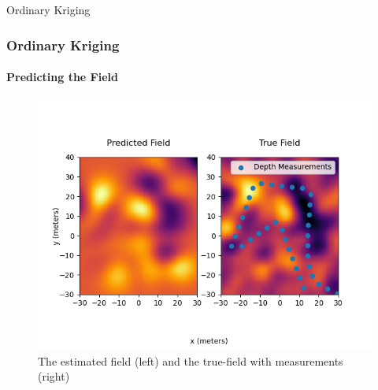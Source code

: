 \documentclass[professionalfont,10pt]{beamer}
\begin{document}
	\begin{frame}[t]{Ordinary Kriging}
		\frametitle{Ordinary Kriging}
		\framesubtitle{Predicting the Field}
		\hskip-0.75cm
		\begin{minipage}[t]{0.2\linewidth}\vspace{-0.5cm}
			\tiny\tableofcontents[currentsection,currentsubsection,hideothersubsections,subsectionstyle=show/shaded]
		\end{minipage}
		\hfill%
		\begin{minipage}[t]{0.86\linewidth}\vspace{-0.5cm}
			\begin{figure}[t]
				\centering
				\captionsetup{width=\textwidth}
				\includegraphics[width=\textwidth]{../images/estimatedField.png}
				\caption{The estimated field (left) and the true-field with measurements (right)}
			\end{figure}
		\end{minipage}
		\vfill%
	\end{frame}
%		
%		
%		


	
\end{document}
